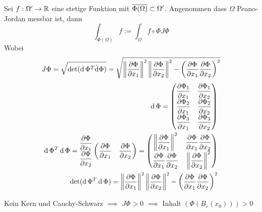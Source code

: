 \begin{Sat}
  Sei $f:\Omega'\to\mb{R}$ eine stetige Funktion mit $\ol{\Phi(\Omega)}\subset\Omega'$. Angenommen dass $\Omega$ Peano-Jordan messbar ist, dann
  \[\int_{\Phi(\Omega)}f:=\int_\Omega f\circ\Phi J\Phi\]
  Wobei
  \[J\Phi=\sqrt{\det(\md\Phi^T\dot\md\Phi)}=\sqrt{\Norm{\Part{\Phi}{x_1}}^2\Norm{\Part{\Phi}{x_2}}^2-\left( \Part{\Phi}{x_1}\Part{\Phi}{x_2} \right)^2}\]
  \begin{eqnarray*}
    \md\Phi = \begin{pmatrix}
      \Part{\Phi_1}{x_1}&\Part{\Phi_1}{x_2}\\
      \Part{\Phi_2}{x_1}&\Part{\Phi_2}{x_2}\\
      \Part{\Phi_3}{x_1}&\Part{\Phi_3}{x_2}
    \end{pmatrix}\\
    \md\Phi^T\md\Phi = \begin{matrix}
      \Part{\Phi}{x_1}\\
      \Part{\Phi}{x_2}
    \end{matrix} \begin{pmatrix}
      \Part{\Phi}{x_1}&\Part{\Phi}{x_2}
    \end{pmatrix} = \begin{pmatrix}
      \Norm{\Part{\Phi}{x_1}}^2&\Part{\Phi}{x_1}\Part{\Phi}{x_2}\\
      \Part{\Phi}{x_1}\Part{\Phi}{x_2}&\Norm{\Part{\Phi}{x_2}}^2
    \end{pmatrix}\\
    \det(\md\Phi^T\md\Phi)=\Norm{\Part{\Phi}{x_1}}^2\Norm{\Part{\Phi}{x_2}}^2-\left( \Part{\Phi}{x_1}\Part{\Phi}{x_2} \right)^2
  \end{eqnarray*}
\end{Sat}
\begin{Bem}
  Kein Kern und Cauchy-Schwarz $\implies$ $J\Phi >0$ $\implies$ Inhalt $(\Phi(B_\varepsilon(x_0)))>0$
\end{Bem}
